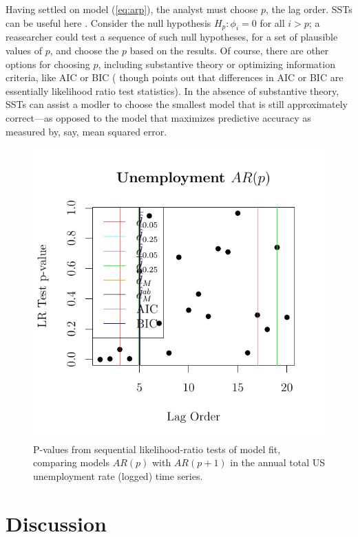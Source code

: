 \documentclass[12pt]{article}\usepackage[]{graphicx}\usepackage[]{color}
\makeatletter
\def\maxwidth{ %
  \ifdim\Gin@nat@width>\linewidth
    \linewidth
  \else
    \Gin@nat@width
  \fi
}
\makeatother
\begin{document}
Having settled on model (\ref{eq:arp}), the analyst must choose $p$,
the lag order.
SSTs can be useful here \citep[e.g.][]{practitionersGuide}.
Consider the null hypothesis $H_p: \phi_i=0$ for all $i>p$;
a reasearcher could test a sequence of such null hypotheses, for a set
of plausible values of $p$, and choose the $p$ based on the results.
Of course, there are other options for choosing $p$, including
substantive theory or optimizing
information criteria, like AIC or BIC
(\citep{akaike1969fitting,schwarz1978estimating} though
\citealt{potscher1991effects} points out that differences in AIC or
BIC are essentially likelihood ratio test statistics).
In the absence of substantive theory, SSTs can assist a modler to
choose the smallest model that is still approximately correct---as
opposed to the model that maximizes predictive accuracy as measured
by, say, mean squared error.

\begin{figure}

\includegraphics[width=\maxwidth]{figure/tsResults-1} 

\caption{P-values from sequential likelihood-ratio tests of model fit,
  comparing models $AR(p)$ with $AR(p+1)$ in the annual total US
  unemployment rate (logged) time series.}
\label{fig:tspvalues1}
\end{figure}








\section{Discussion}\label{sec:discussion}
\end{document}
